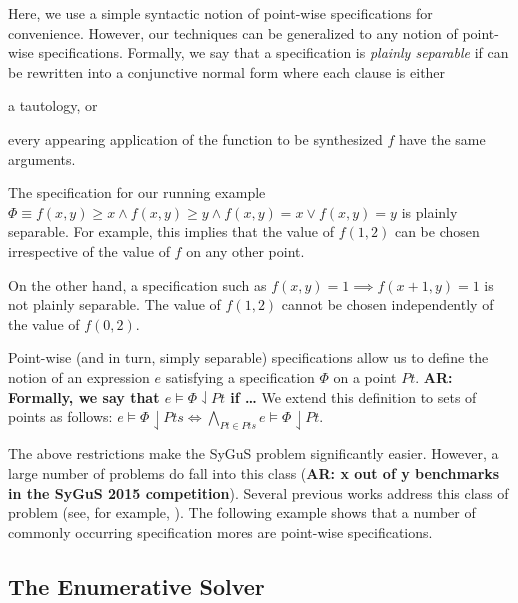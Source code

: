 \documentclass{llncs}
\newcommand\arsays[1]{{\bf AR: #1}}
\newcommand\Points{\mathit{Pts}}
\newcommand\Point{\mathit{Pt}}
\newcommand\Expr{e}
\newcommand\Spec{\Phi}
\newcommand\SynthFun{f}
\begin{document}
Here, we use a simple syntactic notion of point-wise specifications for
convenience.
However, our techniques can be generalized to any notion of point-wise
specifications.
Formally, we say that a specification is {\em plainly separable} if can
be rewritten into a conjunctive normal form where each clause is either
\begin{inparaenum}[(a)]
\item a tautology, or
\item every appearing application of the function to be synthesized
  $\SynthFun$ have the same arguments.
\end{inparaenum}

\begin{example}
  The specification for our running example $\Spec \equiv \SynthFun(x,
  y) \geq x \wedge \SynthFun(x, y) \geq y \wedge \SynthFun(x, y) = x
  \vee \SynthFun(x, y) = y$ is plainly separable.
  For example, this implies that the value of $\SynthFun(1, 2)$ can be
  chosen irrespective of the value of $\SynthFun$ on any other point.

  On the other hand, a specification such as $\SynthFun(x, y) = 1
  \implies \SynthFun(x + 1, y) = 1$ is not plainly separable.
  The value of $\SynthFun(1, 2)$ cannot be chosen independently of the
  value of $\SynthFun(0, 2)$.
\end{example}

Point-wise (and in turn, simply separable) specifications allow us to
define the notion of an expression $\Expr$ satisfying a specification
$\Spec$ on a point $\Point$.
\arsays{Formally, we say that $\Expr \models \Spec \downharpoonleft
\Point$ if \dots}
We extend this definition to sets of points as follows: $\Expr \models
\Spec \downharpoonleft \Points \Leftrightarrow \bigwedge_{\Point \in
\Points} \Expr \models \Spec\downharpoonleft\Point$.

The above restrictions make the SyGuS problem significantly easier.
However, a large number of problems do fall into this class (\arsays{x
out of y benchmarks in the SyGuS 2015 competition}).
Several previous works address this class of problem (see, for
example, \cite{ACR15,Madhu,xxx}).
The following example shows that a number of commonly occurring
specification mores are point-wise specifications.

\subsection{The Enumerative Solver}
\label{sec:enumeration}
\end{document}
